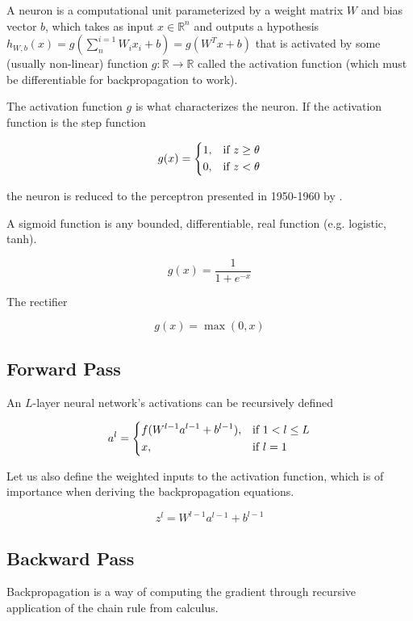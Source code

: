 A neuron is a computational unit parameterized by a weight matrix $W$ and bias vector $b$, which takes as input $x \in \mathbb{R}^{n}$ and outputs a hypothesis $h_{W,b}(x) = g(\sum^{i=1}_{n} W_{i}x_{i} + b) = g(W^Tx + b)$ that is activated by some (usually non-linear) function $g \colon \mathbb{R} \to \mathbb{R}$ called the activation function (which must be differentiable for backpropagation to work).

The activation function $g$ is what characterizes the neuron. If the activation function is the step function

$$
g(x) =
\begin{dcases}
    1,& \text{if } z \geq \theta\\
    0,& \text{if } z < \theta
\end{dcases}
$$

the neuron is reduced to the perceptron presented in 1950-1960 by \citeauthor{perceptron} \cite{perceptron}.

A sigmoid function is any bounded, differentiable, real function (e.g. logistic, tanh).

$$
g(x) = \frac{1}{1 + e^{-x}}
$$

The rectifier

$$
g(x) = \max(0, x)
$$

\subsection{Forward Pass}
\label{subsection:forwardpass}

An $L$-layer neural network's activations can be recursively defined

$$
a^{l} =
\begin{dcases}
    f(W^{l-1}a^{l-1} + b^{l-1}),& \text{if } 1 < l \leq L\\
    x,              & \text{if } l = 1
\end{dcases}
$$

Let us also define the weighted inputs to the activation function, which is of importance when deriving the backpropagation equations.

$$
z^{l} = W^{l-1}a^{l-1} + b^{l-1}
$$

\subsection{Backward Pass}
\label{subsection:backwardpass}

Backpropagation is a way of computing the gradient through recursive application of the chain rule from calculus.

